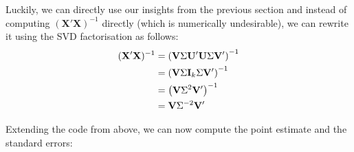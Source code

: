 \documentclass[10pt]{scrartcl}
\begin{document}
Luckily, we can directly use our insights from the previous section and
instead of computing \(\left(\mathbf{X}'\mathbf{X}\right)^{-1}\)
directly (which is numerically undesirable), we can rewrite it using the
SVD factorisation as follows: \[
\def\bV{\mathbf{V}}
\def\bX{\mathbf{X}}
\def\bU{\mathbf{U}}
\def\bY{\mathbf{y}}
\def\ident{\mathbf{I}}
\begin{aligned}
(\bX'\bX)^{-1}
    &= \left(\bV \Sigma \bU' \bU \Sigma \bV' \right)^{-1} \\
    &= \left(\bV \Sigma \ident_k \Sigma \bV' \right)^{-1} \\
    &= \left(\bV \Sigma^2 \bV' \right)^{-1} \\
    &= \bV \Sigma^{-2} \bV'
\end{aligned}
\]

Extending the code from above, we can now compute the point estimate and
the standard errors:
\end{document}

